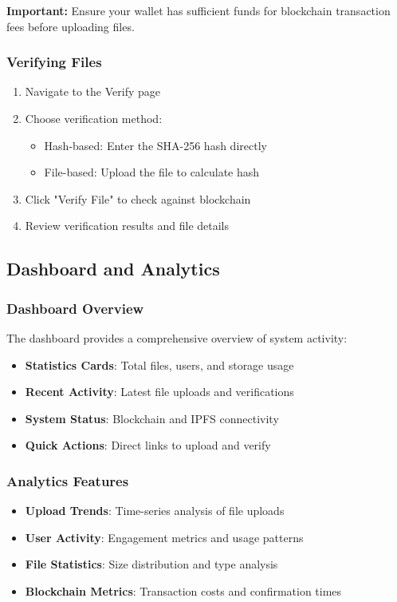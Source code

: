 \documentclass[11pt,a4paper]{article}
\begin{document}
\begin{warningbox}
\textbf{Important:} Ensure your wallet has sufficient funds for blockchain transaction fees before uploading files.
\end{warningbox}

\subsubsection{Verifying Files}
\begin{enumerate}
    \item Navigate to the Verify page
    \item Choose verification method:
    \begin{itemize}
        \item Hash-based: Enter the SHA-256 hash directly
        \item File-based: Upload the file to calculate hash
    \end{itemize}
    \item Click "Verify File" to check against blockchain
    \item Review verification results and file details
\end{enumerate}

\subsection{Dashboard and Analytics}

\subsubsection{Dashboard Overview}
The dashboard provides a comprehensive overview of system activity:

\begin{itemize}
    \item \textbf{Statistics Cards}: Total files, users, and storage usage
    \item \textbf{Recent Activity}: Latest file uploads and verifications
    \item \textbf{System Status}: Blockchain and IPFS connectivity
    \item \textbf{Quick Actions}: Direct links to upload and verify
\end{itemize}

\subsubsection{Analytics Features}
\begin{itemize}
    \item \textbf{Upload Trends}: Time-series analysis of file uploads
    \item \textbf{User Activity}: Engagement metrics and usage patterns
    \item \textbf{File Statistics}: Size distribution and type analysis
    \item \textbf{Blockchain Metrics}: Transaction costs and confirmation times
\end{itemize}
\end{document}
